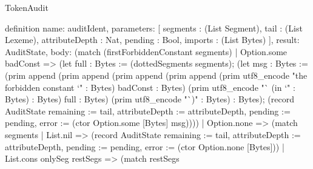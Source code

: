 \begin{lexlean}{TokenAudit}
\begin{semanticmodule}
definition{
  name: auditIdent,
  parameters: [
    segments : (List Segment),
    tail : (List Lexeme),
    attributeDepth : Nat,
    pending : Bool,
    imports : (List Bytes)
  ],
  result: AuditState,
  body: (match (firstForbiddenConstant segments)
    | Option.some badConst => (let full : Bytes := (dottedSegments segments); (let msg : Bytes := (prim append (prim append (prim append (prim append (prim utf8_encode "the forbidden constant `" : Bytes) badConst : Bytes) (prim utf8_encode "` (in `" : Bytes) : Bytes) full : Bytes) (prim utf8_encode "`)" : Bytes) : Bytes); (record AuditState {remaining := tail, attributeDepth := attributeDepth, pending := pending, error := (ctor Option.some [Bytes] msg)})))
    | Option.none => (match segments
      | List.nil => (record AuditState {remaining := tail, attributeDepth := attributeDepth, pending := pending, error := (ctor Option.none [Bytes])})
      | List.cons onlySeg restSegs => (match restSegs
}
\end{semanticmodule}
\end{lexlean}
